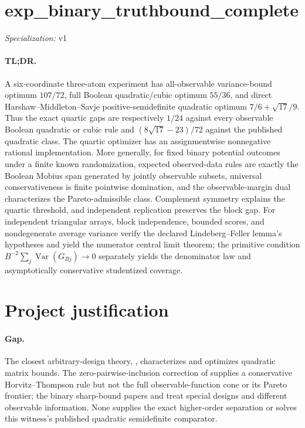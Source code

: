 \documentclass{article}
\begin{document}
\sloppy

\section*{exp\_\allowbreak{}binary\_\allowbreak{}truthbound\_\allowbreak{}complete}

\noindent\textit{Specialization:} v1\par

\paragraph{TL;DR.} A six-coordinate three-atom experiment has all-observable variance-bound optimum \(107/72\), full Boolean quadratic/cubic optimum \(55/36\), and direct Harshaw--Middleton--Savje positive-semidefinite quadratic optimum \(7/6+\sqrt{17}/9\). Thus the exact quartic gaps are respectively \(1/24\) against every observable Boolean quadratic or cubic rule and \((8\sqrt{17}-23)/72\) against the published quadratic class. The quartic optimizer has an assignmentwise nonnegative rational implementation. More generally, for fixed binary potential outcomes under a finite known randomization, expected observed-data rules are exactly the Boolean Mobius span generated by jointly observable subsets, universal conservativeness is finite pointwise domination, and the observable-margin dual characterizes the Pareto-admissible class. Complement symmetry explains the quartic threshold, and independent replication preserves the block gap. For independent triangular arrays, block independence, bounded scores, and nondegenerate average variance verify the declared Lindeberg--Feller lemma's hypotheses and yield the numerator central limit theorem; the primitive condition \(B^{-2}\sum_j\operatorname{Var}(G_{Bj})\to0\) separately yields the denominator law and asymptotically conservative studentized coverage.

\section{Project justification}

\paragraph{Gap.} The closest arbitrary-design theory, \cite{HarshawMiddletonSavje2026}, characterizes and optimizes quadratic matrix bounds. The zero-pairwise-inclusion correction of \cite{AronowSamii2013} supplies a conservative Horvitz--Thompson rule but not the full observable-function cone or its Pareto frontier; the binary sharp-bound papers \cite{Lu2019FactorialBinary} and \cite{AronowGreenLee2014} treat special designs and different observable information. None supplies the exact higher-order separation or solves this witness's published quadratic semidefinite comparator.
\end{document}
